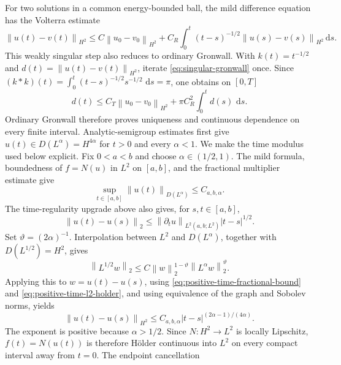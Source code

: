 \documentclass[11pt]{article}
\numberwithin{equation}{section}
\theoremstyle{definition}
\newcommand{\dd}{\,\mathrm d}
\newcommand{\norm}[1]{\left\lVert#1\right\rVert}
\begin{document}
For two solutions in a common energy-bounded ball, the mild difference equation
has the Volterra estimate
\begin{equation}
 \norm{u(t)-v(t)}_{H^2}\le C\norm{u_0-v_0}_{H^2}
 +C_R\int_0^t(t-s)^{-1/2}\norm{u(s)-v(s)}_{H^2}\dd s.
 \label{eq:singular-gronwall}
\end{equation}
This weakly singular step also reduces to ordinary Gronwall.  With
$k(t)=t^{-1/2}$ and $d(t)=\norm{u(t)-v(t)}_{H^2}$, iterate
\eqref{eq:singular-gronwall} once.  Since
$(k*k)(t)=\int_0^t(t-s)^{-1/2}s^{-1/2}\,\dd s=\pi$, one obtains on $[0,T]$
\begin{equation}
 d(t)\le C_T\norm{u_0-v_0}_{H^2}
       +\pi C_R^2\int_0^t d(s)\,\dd s.
 \label{eq:singular-gronwall-reduction}
\end{equation}
Ordinary Gronwall therefore proves uniqueness and continuous dependence on
every finite interval.  Analytic-semigroup estimates first give
$u(t)\in D(L^\alpha)=H^{4\alpha}$ for
$t>0$ and every $\alpha<1$.  We make the time modulus used below explicit.
Fix $0<a<b$ and choose $\alpha\in(1/2,1)$.  The mild formula, boundedness of
$f=N(u)$ in $L^2$ on $[a,b]$, and the fractional multiplier estimate give
\begin{equation}
 \sup_{t\in[a,b]}\norm{u(t)}_{D(L^\alpha)}\le C_{a,b,\alpha}.
 \label{eq:positive-time-fractional-bound}
\end{equation}
The time-regularity upgrade above also gives, for $s,t\in[a,b]$,
\begin{equation}
 \norm{u(t)-u(s)}_2\le
 \norm{\partial_tu}_{L^2(a,b;L^2)}|t-s|^{1/2}.
 \label{eq:positive-time-l2-holder}
\end{equation}
Set $\vartheta=(2\alpha)^{-1}$.  Interpolation between $L^2$ and
$D(L^\alpha)$, together with $D(L^{1/2})=H^2$, gives
\begin{equation}
 \norm{L^{1/2}w}_2\le C\norm{w}_2^{1-\vartheta}
                  \norm{L^\alpha w}_2^\vartheta.
 \label{eq:positive-time-interpolation}
\end{equation}
Applying this to $w=u(t)-u(s)$, using \eqref{eq:positive-time-fractional-bound}
and \eqref{eq:positive-time-l2-holder}, and using equivalence of the graph and
Sobolev norms, yields
\begin{equation}
 \norm{u(t)-u(s)}_{H^2}\le C_{a,b,\alpha}
 |t-s|^{(2\alpha-1)/(4\alpha)}.
 \label{eq:positive-time-h2-holder}
\end{equation}
The exponent is positive because $\alpha>1/2$.  Since $N:H^2\to L^2$ is
locally Lipschitz, $f(t)=N(u(t))$ is therefore Hölder continuous into $L^2$ on every compact interval away from $t=0$.  The endpoint cancellation
\end{document}
